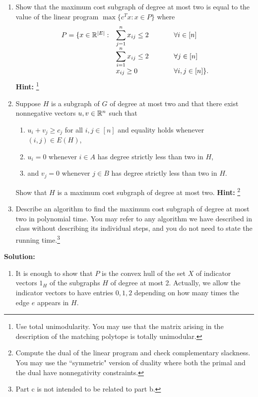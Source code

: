 \documentclass[12pt]{article}
\begin{document}
\begin{enumerate}
\begin{enumerate}
\item Show that the maximum cost subgraph of degree at most two is equal to the value of the linear program $\max\{c^T x: x \in P\}$ where $$ \begin{array}{ll@{\hspace{0.5in}}l}
P=\{ x\in \R^{|E|}: & \displaystyle \sum_{j =1}^n x_{ij}
\leq 2 & \forall i \in [n] \\
& \displaystyle \sum_{i = 1}^n x_{ij}
\leq 2 & \forall j \in [n] \\
 & x_{ij}\geq 0 & \forall i, j \in [n] \}. \end{array}$$
 \textbf{Hint: }\footnote{Use total unimodularity. You may use that the matrix arising in the description of the matching polytope is totally unimodular.}
 \item Suppose $H$ is a subgraph of $G$ of degree at most two and that there exist nonnegative vectors $u,v \in {\mathbb R}^n$ such that
 \begin{enumerate}
 \item $u_i + v_j \geq c_j$ for all $i,j \in [n]$ and equality holds whenever $(i,j) \in E(H)$,
 \item $u_i = 0$ whenever $i \in A$ has degree strictly less than two in $H$,
 \item and $v_j = 0$ whenever $j \in B$ has degree strictly less than two in $H$.
 \end{enumerate}
 Show that $H$ is a maximum cost subgraph of degree at most two. \textbf{Hint: }\footnote{Compute the dual of the linear program and check complementary slackness. You may use the ``symmetric" version of duality where both the primal and the dual have nonnegativity constraints.}
\item Describe an algorithm to find the maximum cost subgraph of degree at most two in polynomial time. You may refer to any algorithm we have described in class without describing its individual steps, and you do not need to state the running time.\footnote{Part c is not intended to be related to part b.}

\end{enumerate}

\noindent \textbf{Solution: }
\begin{enumerate}
\item It is enough to show that $P$ is the convex hull of the set $X$ of indicator vectors $1_H$ of the subgraphs $H$ of degree at most 2. Actually, we allow the indicator vectors to have entries $0,1,2$ depending on how many times the edge $e$ appears in $H$.


\end{enumerate}
\end{enumerate}
\end{document}

